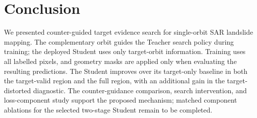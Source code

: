 \section{Conclusion}
\label{sec:conclusion}

We presented counter-guided target evidence search for single-orbit SAR landslide mapping. The complementary orbit guides the Teacher search policy during training; the deployed Student uses only target-orbit information. Training uses all labelled pixels, and geometry masks are applied only when evaluating the resulting predictions. The Student improves over its target-only baseline in both the target-valid region and the full region, with an additional gain in the target-distorted diagnostic. The counter-guidance comparison, search intervention, and loss-component study support the proposed mechanism; matched component ablations for the selected two-stage Student remain to be completed.
